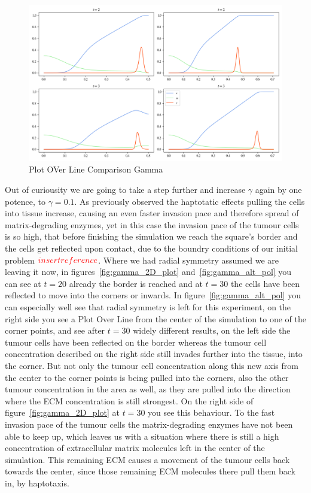 \begin{figure}[h]
    \centering
    \includegraphics[width=\textwidth]{resources/images/gamma_pol_comparison.png}
    \caption{Plot OVer Line Comparison Gamma}
    \label{fig:gamma_pol_comparison}
\end{figure}
Out of curiousity we are going to take a step further and increase $\gamma$ again by one potence, to $\gamma=0.1$. As previously observed the haptotatic effects pulling the cells into tissue increase, causing an even faster invasion pace and therefore spread of matrix-degrading enzymes, yet in this case the invasion pace of the tumour cells is so high, that before finishing the simulation we reach the square's border and the cells get reflected upon contact, due to the boundry conditions of our initial problem $\textcolor{red}{insertreference}$. Where we had radial symmetry assumed we are leaving it now, in figures~\ref{fig:gamma_2D_plot} and~\ref{fig:gamma_alt_pol} you can see at $t=20$ already the border is reached and at $t=30$ the cells have been reflected to move into the corners or inwards. In figure~\ref{fig:gamma_alt_pol} you can especially well see that radial symmetry is left for this experiment, on the right side you see a Plot Over Line from the center of the simulation to one of the corner points, and see after $t=30$ widely different results, on the left side the tumour cells have been reflected on the border whereas the tumour cell concentration described on the right side still invades further into the tissue, into the corner. But not only the tumour cell concentration along this new axis from the center to the corner points is being pulled into the corners, also the other tumour concentration in the area as well, as they are pulled into the direction where the ECM concentration is still strongest. On the right side of figure~\ref{fig:gamma_2D_plot} at $t=30$ you see this behaviour. To the fast invasion pace of the tumour cells the matrix-degrading enzymes have not been able to keep up, which leaves us with a situation where there is still a high concentration of extracellular matrix molecules left in the center of the simulation. This remaining ECM causes a movement of the tumour cells back towards the center, since those remaining ECM molecules there pull them back in, by haptotaxis.
